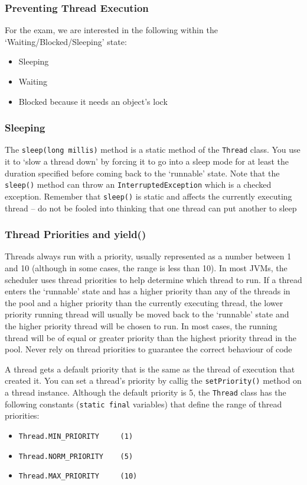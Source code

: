 \subsubsection{Preventing Thread Execution}
For the exam, we are interested in the following within the 
`Waiting/Blocked/Sleeping' state:
\begin{itemize}
    \item Sleeping
    \item Waiting
    \item Blocked because it needs an object's lock
\end{itemize}
\subsubsection{Sleeping}
The \verb#sleep(long millis)# method is a static method of the \verb#Thread# 
class. You use it to `slow a thread down' by forcing it to go into a sleep mode 
for at least the duration specified before coming back to the `runnable' state.  
Note that the \verb#sleep()# method can throw an \verb#InterruptedException# 
which is a checked exception. Remember that \verb#sleep()# is static and 
affects the currently executing thread -- do not be fooled into thinking that 
one thread can put another to sleep

\subsubsection{Thread Priorities and yield()}
Threads always run with a priority, usually represented as a number between 1 
and 10 (although in some cases, the range is less than 10). In most JVMs, the 
scheduler uses thread priorities to help determine which thread to run. If a 
thread enters the `runnable' state and has a higher priority than any of the 
threads in the pool and a higher priority than the currently executing thread, 
the lower priority running thread will usually be moved back to the `runnable' 
state and the higher priority thread will be chosen to run. In most cases, the 
running thread will be of equal or greater priority than the highest priority 
thread in the pool. Never rely on thread priorities to guarantee the correct 
behaviour of code

A thread gets a default priority that is the same as the thread of execution 
that created it. You can set a thread's priority by callig the 
\verb#setPriority()# method on a thread instance. Although the default priority 
is 5, the \verb#Thread# class has the following constants (\verb#static final# 
variables) that define the range of thread priorities:
\begin{itemize}
    \item \verb#Thread.MIN_PRIORITY     (1)#
    \item \verb#Thread.NORM_PRIORITY    (5)#
    \item \verb#Thread.MAX_PRIORITY     (10)#
\end{itemize}

